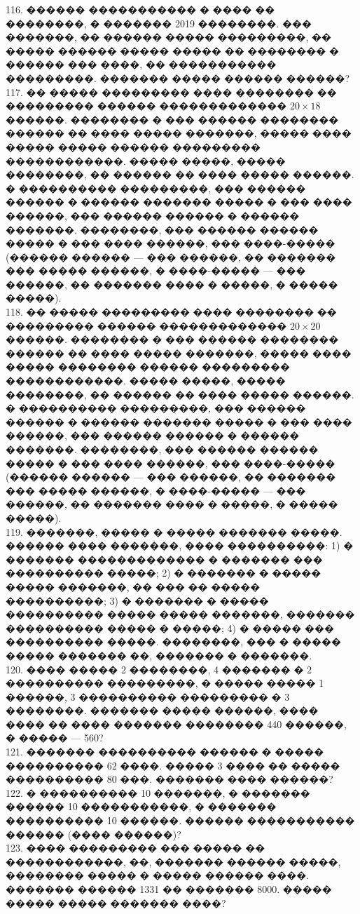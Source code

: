 \documentclass[12pt]{article}
\begin{document}
116. ������ ����������� � ���� �� ��������, � ������� 2019 ��������. ��� �������, �� ������ ����� ���������, �� ����� ������ ����� ����� �� �������� � ������ ��� ����, �� ����������� ���������. ������� ����� ������ ������?\\
117. �� ����� ��������� ���� �������� �� ��������� ������ ������������� $20\times18$ ������. �������� � ��� ������ �������� ������ �� ���� ����� �������, ����� ���� ����� ����� ������ ��������� ������������. ����� �����, ����� ��������, �� ������ �� ���� ����� ������. � ���������� ���������, ��� ������ ������ � ������ ������� ����� � ��� ���� ������, ��� ������ ������ � ������ �������. ��������, ��� ������ ������ ����� � ��� ���� ������, ��� ����-����� (������ ������ --- ��� ������, �� ������� ��� ����� ������, � ����-����� --- ��� ������, �� ������� ���� � �����, � ����� �����).\\
118.  �� ����� ��������� ���� �������� �� ��������� ������ ������������� $20\times20$ ������. �������� � ��� ������ �������� ������ �� ���� ����� �������, ����� ���� ����� �������� ������ ��������� ������������. ����� �����, ����� ��������, �� ������ �� ���� ����� ������. � ���������� ���������, ��� ������ ������ � ������ ������� ����� � ��� ���� ������, ��� ������ ������ � ������ �������. ��������, ��� ������ ������ ����� � ��� ���� ������, ��� ����-����� (������ ������ --- ��� ������, �� ������� ��� ����� ������, � ����-����� --- ��� ������, �� ������� ���� � �����, � ����� �����).\\
119. �������, ����� � ����� ������� �����. ������ ���� �������, ���� ����������: 1) � ������� ������������� � ������� ��� ���������� �����; 2) � ������� � ����� ����� �������, �� ��� �� ����� ����������; 3) � ������� � ����� ���������� ����� ����� �������, ������� ���������� ����� � �����; 4) � ����� ��� ���������� �����. ��������, ��� � ����� ����� ������� ��, ������� � �������.\\
120. ���� ����� 2 ��������, 4 ������� � 2 ���������� ���������, � ����� ����� 1 ������, 3 ���������� ��������� � 3 ��������. ������� ����� ������, ���� ���� �� ���� ������� �������� 440 ������, � ����� --- 560?\\
121. ������� ���������� ������ � ����� ���������� 62 ����. ����� 3 ���� �� ����� ���������� 80 ���. ������� ���� ������?\\
122. � ���������� 10 �������, � ������� ������ 10 �����������, � ������� ���������� 10 ������. ������ ����������� ������ (���� ������)?\\
123. ���� ��������� ��� ����� �� ������������, ��, ������� ������ �����, �������� ����� � ����� ������ ����. ������� ������ 1331 �� ������� 8000. ����� ����� ����� ������� ����?\\
\end{document}
